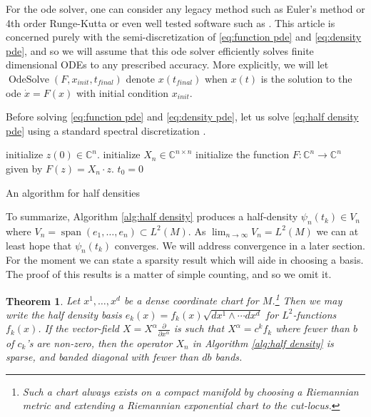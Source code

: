 \documentclass[final,leqno]{siamltex1213}
\newcommand{\pder}[2]{\ensuremath{\frac{ \partial #1}{\partial #2}}}
\newtheorem{thm}{Theorem}[section]
\DeclareMathOperator{\OdeSolve}{OdeSolve}
\begin{document}
For the ode solver, one can consider any legacy method such as Euler's method or 4th order Runge-Kutta or even well tested software such as \cite{VODE}.
This article is concerned purely with the semi-discretization of \eqref{eq:function pde} and \eqref{eq:density pde}, and so we will assume that this ode solver 
efficiently solves finite dimensional ODEs to any prescribed accuracy.
More explicitly, we will let $\OdeSolve ( F , x_{init} , t_{final} )$ denote $x(t_{final})$ when $x(t)$ is the solution to the ode $\dot{x} = F(x)$ with initial condition $x_{init}$.

Before solving \eqref{eq:function pde} and \eqref{eq:density pde}, let us solve \eqref{eq:half density pde} using a standard spectral discretization \cite{Boyd2001,NumericalRecipes}.

\begin{algorithm}
	initialize $z(0) \in \mathbb{C}^{n}$.\;
	initialize $X_{n} \in \mathbb{C}^{n \times n}$\;
	initialize the function $F: \mathbb{C}^{n} \to \mathbb{C}^{n}$ given by $F(z) = X_{n} \cdot z$.\;
	$t_{0} = 0$\;
	\caption{An algorithm for half densities} \label{alg:half density}
\end{algorithm}

To summarize, Algorithm \ref{alg:half density} produces a half-density $\psi_{n}(t_{k}) \in V_{n}$ where $V_{n} = \operatorname{span}( e_{1},\dots,e_{n}) \subset L^{2}(M)$.
As $\lim_{n\to \infty} V_{n} = L^{2}(M)$ we can at least hope that $\psi_{n}(t_{k})$ converges.
We will address convergence in a later section.
For the moment we can state a sparsity result which will aide in choosing a basis.
The proof of this results is a matter of simple counting, and so we omit it.

\begin{thm} \label{thm:sparsity}
	Let $x^{1},\dots,x^{d}$ be a dense coordinate chart for $M$.\footnote{Such a chart always exists on a compact manifold by choosing a Riemannian metric and extending a Riemannian exponential chart to the cut-locus.\cite{Sakai1996,MO_dense_charts} }
	Then we may write the half density basis $e_{k} (x)= f_{k}(x) \sqrt{dx^{1} \wedge \cdots dx^{d}}$ for $L^{2}$-functions $f_{k}(x)$.
	If the vector-field $X = X^{\alpha} \pder{}{x^{\alpha}}$ is such that $X^{\alpha} = c^{k} f_{k}$ where fewer than $b$ of $c_{k}$'s are non-zero, then
	the operator $X_{n}$ in Algorithm \ref{alg:half density} is sparse, and banded diagonal with fewer than $db$ bands.
\end{thm}
\end{document}

